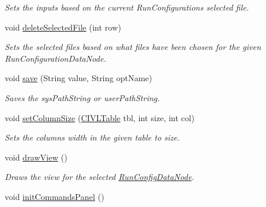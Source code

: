 \begin{DoxyCompactItemize}
\begin{DoxyCompactList}\small\item\em Sets the inputs based on the current Run\+Configuration\textquotesingle{}s selected file. \end{DoxyCompactList}\item 
void \hyperlink{classedu_1_1udel_1_1cis_1_1vsl_1_1civl_1_1gui_1_1common_1_1GUI__revamp_a796c2bdc218afa3a10c98cdb3e1590d3}{delete\+Selected\+File} (int row)
\begin{DoxyCompactList}\small\item\em Sets the selected files based on what files have been chosen for the given Run\+Configuration\+Data\+Node. \end{DoxyCompactList}\item 
void \hyperlink{classedu_1_1udel_1_1cis_1_1vsl_1_1civl_1_1gui_1_1common_1_1GUI__revamp_a848f0f6170f9fb8950c4f8d874fa6081}{save} (String value, String opt\+Name)
\begin{DoxyCompactList}\small\item\em Saves the sys\+Path\+String or user\+Path\+String. \end{DoxyCompactList}\item 
void \hyperlink{classedu_1_1udel_1_1cis_1_1vsl_1_1civl_1_1gui_1_1common_1_1GUI__revamp_a19f8e5f20cd9f7f2a4844133f60a9454}{set\+Column\+Size} (\hyperlink{classedu_1_1udel_1_1cis_1_1vsl_1_1civl_1_1gui_1_1common_1_1CIVLTable}{C\+I\+V\+L\+Table} tbl, int size, int col)
\begin{DoxyCompactList}\small\item\em Sets the columns\textquotesingle{} width in the given table to size. \end{DoxyCompactList}\item 
\hypertarget{classedu_1_1udel_1_1cis_1_1vsl_1_1civl_1_1gui_1_1common_1_1GUI__revamp_ac1c266b6a987b5ae9ed6c170f33a0095}{}void \hyperlink{classedu_1_1udel_1_1cis_1_1vsl_1_1civl_1_1gui_1_1common_1_1GUI__revamp_ac1c266b6a987b5ae9ed6c170f33a0095}{draw\+View} ()\label{classedu_1_1udel_1_1cis_1_1vsl_1_1civl_1_1gui_1_1common_1_1GUI__revamp_ac1c266b6a987b5ae9ed6c170f33a0095}

\begin{DoxyCompactList}\small\item\em Draws the view for the selected \hyperlink{classedu_1_1udel_1_1cis_1_1vsl_1_1civl_1_1gui_1_1common_1_1RunConfigDataNode}{Run\+Config\+Data\+Node}. \end{DoxyCompactList}\item 
\hypertarget{classedu_1_1udel_1_1cis_1_1vsl_1_1civl_1_1gui_1_1common_1_1GUI__revamp_a3274ee67d6ce770b43ac53b134acbebc}{}void \hyperlink{classedu_1_1udel_1_1cis_1_1vsl_1_1civl_1_1gui_1_1common_1_1GUI__revamp_a3274ee67d6ce770b43ac53b134acbebc}{init\+Commands\+Panel} ()\label{classedu_1_1udel_1_1cis_1_1vsl_1_1civl_1_1gui_1_1common_1_1GUI__revamp_a3274ee67d6ce770b43ac53b134acbebc}


\end{DoxyCompactItemize}
